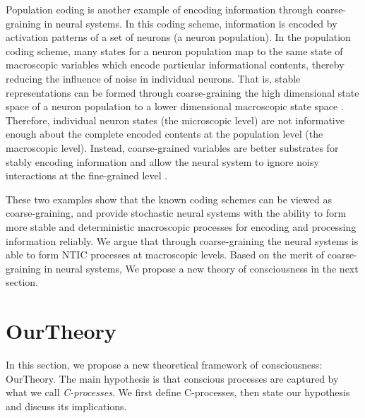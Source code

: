 \documentclass[utf8]{article}
\begin{document}
		Population coding is another example of encoding information through coarse-graining in neural systems. In this coding scheme, information is encoded by activation patterns of a set of neurons (a neuron population). In the population coding scheme, many states for a neuron population map to the same state of macroscopic variables which encode particular informational contents, thereby reducing the influence of noise in individual neurons. That is, stable representations can be formed through coarse-graining the high dimensional state space of a neuron population to a lower dimensional macroscopic state space \citep{kristan1997population, pouget2000information, binder2009encyclopedia, QuianQuiroga2009}. Therefore, individual neuron states (the microscopic level) are not informative enough about the complete encoded contents at the population level (the macroscopic level). Instead, coarse-grained variables are better substrates for stably encoding information and allow the neural system to ignore noisy interactions at the fine-grained level \citep{Woodward2007-WOOCWA}.
		
        These two examples show that the known coding schemes can be viewed as coarse-graining, and provide stochastic neural systems with the ability to form more stable and deterministic macroscopic processes for encoding and processing information reliably. We argue that through coarse-graining the neural systems is able to form NTIC processes at macroscopic levels. Based on the merit of coarse-graining in neural systems, We propose a new theory of consciousness in the next section. 



	\section{\acf{OurTheory}}\label{sec:OurTheory}
	
        In this section, we propose a new theoretical framework of consciousness: \acf{OurTheory}. The main hypothesis is that conscious processes are captured by what we call \textit{C-processes}. We first define C-processes, then state our hypothesis and discuss its implications.
        
\end{document}
